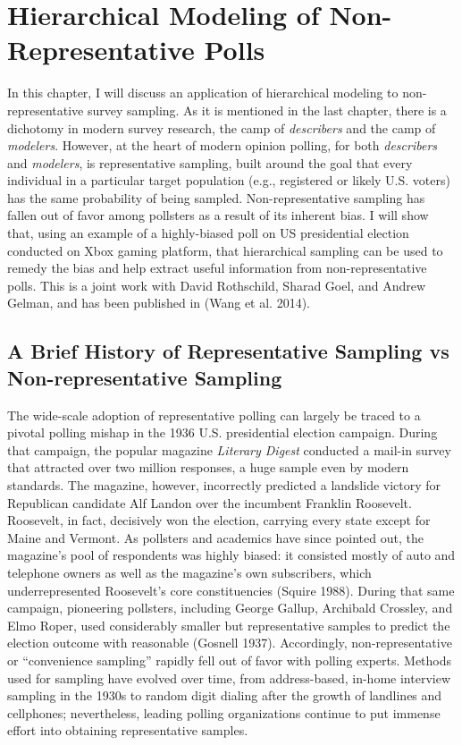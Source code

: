 \chapter{Hierarchical Modeling of Non-Representative Polls}

In this chapter, I will discuss an application of hierarchical modeling
to non-representative survey sampling. As it is mentioned in the last
chapter, there is a dichotomy in modern survey research, the camp of
\emph{describers} and the camp of \emph{modelers}. However, at the heart
of modern opinion polling, for both \emph{describers} and
\emph{modelers}, is representative sampling, built around the goal that
every individual in a particular target population (e.g., registered or
likely U.S. voters) has the same probability of being sampled.
Non-representative sampling has fallen out of favor among pollsters as a
result of its inherent bias. I will show that, using an example of a
highly-biased poll on US presidential election conducted on Xbox gaming
platform, that hierarchical sampling can be used to remedy the bias and
help extract useful information from non-representative polls. This is a
joint work with David Rothschild, Sharad Goel, and Andrew Gelman, and
has been published in (Wang et al. 2014).

\section{A Brief History of Representative Sampling vs
Non-representative
Sampling}\label{a-brief-history-of-representative-sampling-vs-non-representative-sampling}

The wide-scale adoption of representative polling can largely be traced
to a pivotal polling mishap in the 1936 U.S. presidential election
campaign. During that campaign, the popular magazine \emph{Literary
Digest} conducted a mail-in survey that attracted over two million
responses, a huge sample even by modern standards. The magazine,
however, incorrectly predicted a landslide victory for Republican
candidate Alf Landon over the incumbent Franklin Roosevelt. Roosevelt,
in fact, decisively won the election, carrying every state except for
Maine and Vermont. As pollsters and academics have since pointed out,
the magazine's pool of respondents was highly biased: it consisted
mostly of auto and telephone owners as well as the magazine's own
subscribers, which underrepresented Roosevelt's core constituencies
(Squire 1988). During that same campaign, pioneering pollsters,
including George Gallup, Archibald Crossley, and Elmo Roper, used
considerably smaller but representative samples to predict the election
outcome with reasonable (Gosnell 1937). Accordingly, non-representative
or ``convenience sampling'' rapidly fell out of favor with polling
experts. Methods used for sampling have evolved over time, from
address-based, in-home interview sampling in the 1930s to random digit
dialing after the growth of landlines and cellphones; nevertheless,
leading polling organizations continue to put immense effort into
obtaining representative samples.

